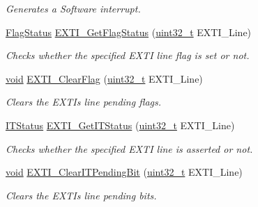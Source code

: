\begin{DoxyCompactItemize}
\begin{DoxyCompactList}\small\item\em Generates a Software interrupt. \end{DoxyCompactList}\item 
\hyperlink{agilefox_2library_2inc_2stm32f10x__type_8h_a89136caac2e14c55151f527ac02daaff}{Flag\+Status} \hyperlink{group___e_x_t_i___private___functions_ga0ce06e6b312592df149800d63218cffa}{E\+X\+T\+I\+\_\+\+Get\+Flag\+Status} (\hyperlink{_p_e___types_8h_a33594304e786b158f3fb30289278f5af}{uint32\+\_\+t} E\+X\+T\+I\+\_\+\+Line)
\begin{DoxyCompactList}\small\item\em Checks whether the specified E\+X\+TI line flag is set or not. \end{DoxyCompactList}\item 
\hyperlink{usb__devapi_8h_afabf60e7f57651d6d595a02c75f07cd0}{void} \hyperlink{group___e_x_t_i___private___functions_ga8e07aaaa286dea4803605d5968850a92}{E\+X\+T\+I\+\_\+\+Clear\+Flag} (\hyperlink{_p_e___types_8h_a33594304e786b158f3fb30289278f5af}{uint32\+\_\+t} E\+X\+T\+I\+\_\+\+Line)
\begin{DoxyCompactList}\small\item\em Clears the E\+X\+TI\textquotesingle{}s line pending flags. \end{DoxyCompactList}\item 
\hyperlink{agilefox_2library_2inc_2stm32f10x__type_8h_aacbd7ed539db0aacd973a0f6eca34074}{I\+T\+Status} \hyperlink{group___e_x_t_i___private___functions_gaf7b51519062ae42fd27ee689cab364aa}{E\+X\+T\+I\+\_\+\+Get\+I\+T\+Status} (\hyperlink{_p_e___types_8h_a33594304e786b158f3fb30289278f5af}{uint32\+\_\+t} E\+X\+T\+I\+\_\+\+Line)
\begin{DoxyCompactList}\small\item\em Checks whether the specified E\+X\+TI line is asserted or not. \end{DoxyCompactList}\item 
\hyperlink{usb__devapi_8h_afabf60e7f57651d6d595a02c75f07cd0}{void} \hyperlink{group___e_x_t_i___private___functions_ga3652a7e682728b310c124e7e974d1468}{E\+X\+T\+I\+\_\+\+Clear\+I\+T\+Pending\+Bit} (\hyperlink{_p_e___types_8h_a33594304e786b158f3fb30289278f5af}{uint32\+\_\+t} E\+X\+T\+I\+\_\+\+Line)
\begin{DoxyCompactList}\small\item\em Clears the E\+X\+TI\textquotesingle{}s line pending bits. \end{DoxyCompactList}\end{DoxyCompactItemize}


